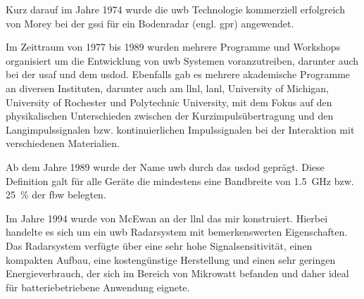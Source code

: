 
Kurz darauf im Jahre 1974 wurde die \gls{uwb} Technologie kommerziell erfolgreich von Morey bei der \gls{gssi} für ein Bodenradar (engl. \acrfull{gpr}) angewendet. \cite{barrett2001technical}

Im Zeittraum von 1977 bis 1989 wurden mehrere Programme und Workshops organisiert um die Entwicklung von \gls{uwb} Systemen voranzutreiben, darunter auch bei der \gls{usaf} und dem \gls{usdod}. Ebenfalls gab es mehrere akademische Programme an diversen Instituten, darunter auch am \gls{llnl}, \gls{lanl}, University of Michigan, University of Rochester und
Polytechnic University, mit dem Fokus auf den physikalischen Unterschieden zwischen der Kurzimpulsübertragung und den Langimpulssignalen bzw. kontinuierlichen Impulssignalen bei der Interaktion mit verschiedenen Materialien.\cite{barrett2001technical}

Ab dem Jahre 1989 wurde der Name \gls{uwb}\footnotemark{} durch das \gls{usdod} geprägt. Diese Definition galt für alle Geräte die mindestens eine Bandbreite von \SI{1.5}{\GHz} bzw. \SI{25}{\percent} der \gls{fbw} belegten. \cite{eltaher2004positioning, fowler1990assessment, yang2004uwbcom, aiello2006ultra, fontana2004recent}


Im Jahre 1994 wurde von McEwan an der \gls{llnl} das \gls{mir} konstruiert. Hierbei handelte es sich um ein \gls{uwb} Radarsystem mit bemerkenswerten Eigenschaften. Das Radarsystem verfügte über eine sehr hohe Signalsensitivität, einen kompakten Aufbau, eine kostengünstige Herstellung und einen sehr geringen Energieverbrauch, der sich im Bereich von Mikrowatt befanden und daher ideal für batteriebetriebene Anwendung eignete. \cite{barrett2001technical}

